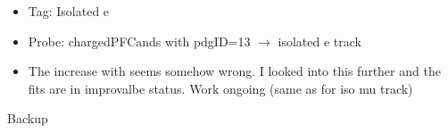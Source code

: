 \documentclass{beamer}
\begin{document}
\begin{frame}
\begin{columns}
\begin{column}{0.33\textwidth}
   \end{column}
  \end{columns}
\begin{itemize}
 \item Tag: Isolated e
 \item Probe: chargedPFCands with pdgID=13 $\rightarrow$ isolated e track
 \item The increase with \pt seems somehow wrong. I looked into this further and the fits are in improvalbe status. Work ongoing (same as for iso mu track)
\end{itemize}
\end{frame}






\begin{frame}
 \begin{block}{}
 \centering
 \Large Backup
 \end{block}
\end{frame}
\end{document}
